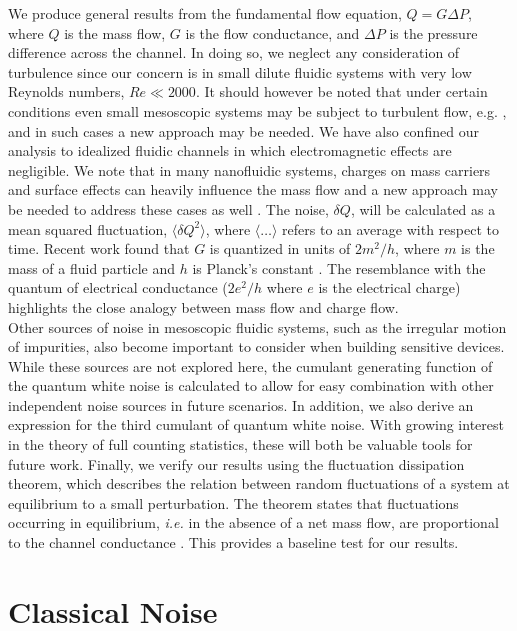 \documentclass[%
 reprint,
 aps,
 prb,
 epsf,
]{revtex4-2}
\begin{document}
    We produce general results from the fundamental flow equation, $Q = G\Delta P$, where $Q$ is the mass flow, $G$ is the flow conductance, and $\Delta P$ is the pressure difference across the channel. In doing so, we neglect any consideration of turbulence since our concern is in small dilute fluidic systems with very low Reynolds numbers, $Re  \ll  2000$. It should however be noted that under certain conditions even small mesoscopic systems may be subject to turbulent flow, e.g. \cite{microchannels, microchannels 2, micropipes}, and in such cases a new approach may  be needed.  We have also confined our analysis to idealized fluidic channels in which electromagnetic effects are negligible. We note that in many nanofluidic systems, charges on mass carriers and surface effects can heavily influence the mass flow and a new approach may be needed to address these cases as well \cite{gogoi,kavokine}. The noise, $\delta Q$, will be calculated as a mean squared fluctuation, $\langle \delta Q^2\rangle$, where $\langle \dots\rangle$ refers to an average with respect to time. Recent work found that $G$ is quantized in units of $2m^2/h$, where $m$ is the mass of a fluid particle and $h$ is Planck's constant \cite{Lambert2008, quantized}. The resemblance with the quantum of electrical conductance ($2e^2/h$ where $e$ is the electrical charge) highlights the close analogy between mass flow and charge flow. \\
    
    Other sources of noise in mesoscopic fluidic systems, such as the irregular motion of impurities, also become important to consider when building sensitive devices. While these sources are not explored here, the cumulant generating function of the quantum white noise is calculated to allow for easy combination with other independent noise sources in future scenarios. In addition, we also derive an expression for the third cumulant of quantum white noise. With growing interest in the theory of full counting statistics, these will both be valuable tools for future work. Finally, we verify our results using the fluctuation dissipation theorem, which describes the relation between random fluctuations of a system at equilibrium to a small perturbation. The theorem states that fluctuations occurring in equilibrium, {\it i.e.} in the absence of a net mass flow, are proportional to the channel conductance \cite{fractional}. This provides a baseline test for our results.



\section{\label{sec:classnoise}Classical Noise}
\end{document}
